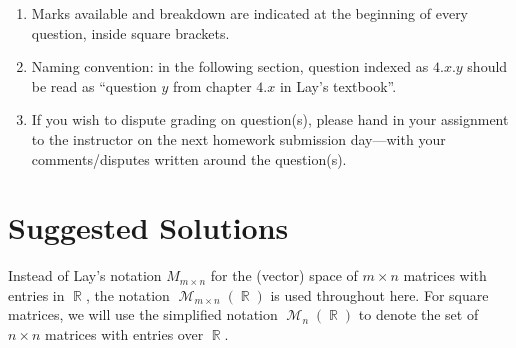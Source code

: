 \documentclass{amsart}
\theoremstyle{definition}
\theoremstyle{definition}
\DeclareMathOperator{\R}{\mathbb{R}}
\DeclareMathOperator{\1}{\mathbbm{1}}
\DeclareMathOperator{\MM}{\mathcal{M}}
\renewcommand{\leq}{\leqslant}
\newcommand{\polyn}[2]{\mathcal{P}_{#1}(#2)}
\begin{document}
\begin{enumerate}[itemsep=.75em]
		\item Marks available and breakdown are indicated at the beginning of every question, inside square brackets. 
		
		\item Naming convention: in the following section, question indexed as $4.x.y$ should be read as ``question $y$ from chapter $4.x$ in Lay's textbook''.
		
		\item If you wish to dispute grading on question(s), please hand in your assignment to the instructor on the next homework submission day---with your comments/disputes written around the question(s).
		
	\end{enumerate}
	
	
	
	\clearpage
	
	\section*{Suggested Solutions}
	
		Instead of Lay's notation $M_{m \times n}$ for the (vector) space of $m \times n$ matrices with entries in $\R$, the notation $\MM_{m \times n}(\R)$ is used throughout here. For square matrices, we will use the simplified notation $\MM_{n}(\R)$ to denote the set of $n \times n$ matrices with entries over $\R$.
	
	\bigskip
	
\end{document}
